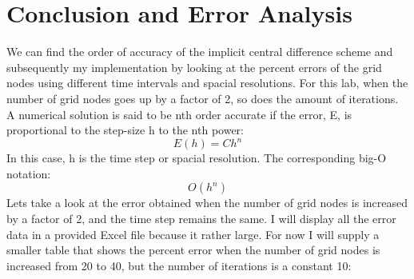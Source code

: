 \documentclass[12pt]{article}
\begin{document}
\section{Conclusion and Error Analysis}\label{sec::conclusion}
We can find the order of accuracy of the implicit central difference scheme and subsequently my implementation by looking at the percent errors of the grid nodes using different time intervals and spacial resolutions. For this lab, when the number of grid nodes goes up by a factor of 2, so does the amount of iterations. A numerical solution is said to be nth order accurate if the error, E, is proportional to the step-size h to the nth power:
\begin{equation}
E(h) = Ch^n
\end{equation}
In this case, h is the time step or spacial resolution. The corresponding big-O notation:
\begin{equation}
O(h^n)
\end{equation}
Lets take a look at the error obtained when the number of grid nodes is increased by a factor of 2, and the time step remains the same. I will display all the error data in a provided Excel file because it rather large. For now I will supply a smaller table that shows the percent error when the number of grid nodes is increased from 20 to 40, but the number of iterations is a constant 10:
\end{document}
